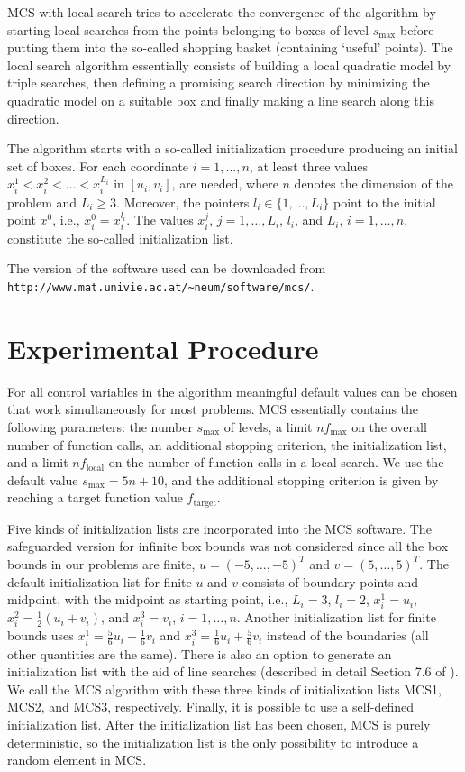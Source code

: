 \documentclass{sig-alternate}
\begin{document}
MCS with local search tries to accelerate the convergence of the algorithm by
starting local searches from the points belonging to boxes of level $s_{\max}$
before putting them into the so-called shopping basket (containing `useful' points). 
The local search algorithm essentially consists of building a local quadratic
model by triple searches, then defining a promising search direction by minimizing 
the quadratic model on a suitable box and finally making a line search along this
direction.
 
The algorithm starts with a so-called initialization procedure producing an 
initial set of boxes. For each coordinate $i =1,\dots,n$, at least three values
$x_i^1 < x_i^2 < \dots < x_i^{L_i}$ in $[u_i,v_i]$, are needed, where $n$ denotes 
the dimension of the problem and $L_i \ge 3$. Moreover, the pointers $l_i \in 
\{1,\dots,L_i\}$ point to the initial point $x^0$, i.e., $x_i^0 = x_i^{l_i}$. The
values $x_i^j$, $j=1,\dots,L_i$, $l_i$, and $L_i$, $i=1,\dots,n$, constitute the
so-called initialization list.

The version of the software used can be downloaded from
\verb|http://www.mat.univie.ac.at/~neum/software/mcs/|.


\section{Experimental Procedure}
%

For all control variables in the algorithm meaningful default values can be 
chosen that work simultaneously for most problems. MCS essentially contains 
the following parameters: the number $s_{\max}$ of levels, a limit $nf_{\max}$ on the 
overall number of function calls, an additional stopping criterion, the 
initialization list, and a limit $nf_\text{local}$ on the number of function calls 
in a local search. We use the default value $s_{\max} = 5n+10$, and the additional 
stopping criterion is given by reaching a target function value $f_\text{target}$.

Five kinds of initialization lists are incorporated into the MCS software. The 
safeguarded version for infinite box bounds was not considered since all the box
bounds in our problems are finite, $u = (-5,\dots,-5)^T$ and $v = (5,\dots,5)^T$. 
The default initialization list for finite $u$ and $v$ consists of boundary points and
midpoint, with the midpoint as starting point, i.e., $L_i=3$, $l_i = 2$, $x_i^1 = u_i$,
$x_i^2 = \frac12(u_i+v_i)$, and $x_i^3 = v_i$, $i=1,\dots,n$. 
Another initialization list for finite bounds uses $x_i^1 = \frac56 u_i + \frac16 v_i$ and $x_i^3 = \frac16
u_i + \frac56 v_i$ instead of the boundaries (all other quantities are the same).
There is also an option to generate an initialization list with the aid of line
searches (described in detail Section 7.6 of \cite{mcs}). We call the
MCS algorithm with these three kinds of initialization lists MCS1, MCS2, and MCS3,
respectively. Finally, it is
possible to use a self-defined initialization list. After the initialization list 
has been chosen, MCS is purely deterministic, so the initialization list is the
only possibility to introduce a random element in MCS.
\end{document}
